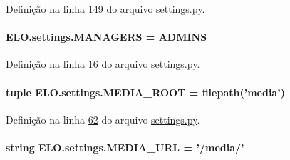 Definição na linha \hyperlink{settings_8py_source_l00149}{149} do arquivo \hyperlink{settings_8py_source}{settings.\-py}.

\hypertarget{namespaceELO_1_1settings_a43e8826e0b24e337065b4975f3eace4c}{
\paragraph[{M\-A\-N\-A\-G\-E\-R\-S}]{\setlength{\rightskip}{0pt plus 5cm}E\-L\-O.\-settings.\-M\-A\-N\-A\-G\-E\-R\-S = {\bf A\-D\-M\-I\-N\-S}}}\label{namespaceELO_1_1settings_a43e8826e0b24e337065b4975f3eace4c}


Definição na linha \hyperlink{settings_8py_source_l00016}{16} do arquivo \hyperlink{settings_8py_source}{settings.\-py}.

\hypertarget{namespaceELO_1_1settings_a7f83b56101acea110bb525439aaa69aa}{
\paragraph[{M\-E\-D\-I\-A\-\_\-\-R\-O\-O\-T}]{\setlength{\rightskip}{0pt plus 5cm}tuple E\-L\-O.\-settings.\-M\-E\-D\-I\-A\-\_\-\-R\-O\-O\-T = {\bf filepath}('media')}}\label{namespaceELO_1_1settings_a7f83b56101acea110bb525439aaa69aa}


Definição na linha \hyperlink{settings_8py_source_l00062}{62} do arquivo \hyperlink{settings_8py_source}{settings.\-py}.

\hypertarget{namespaceELO_1_1settings_acd3e1c3559f7c87f5aad004b76458ddc}{
\paragraph[{M\-E\-D\-I\-A\-\_\-\-U\-R\-L}]{\setlength{\rightskip}{0pt plus 5cm}string E\-L\-O.\-settings.\-M\-E\-D\-I\-A\-\_\-\-U\-R\-L = '/media/'}}\label{namespaceELO_1_1settings_acd3e1c3559f7c87f5aad004b76458ddc}


